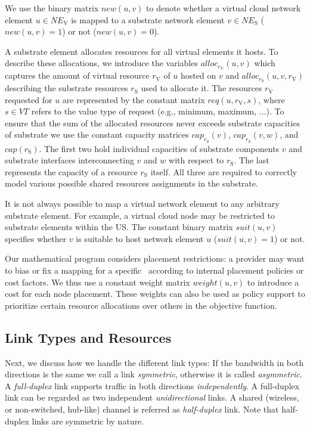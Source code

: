 \documentclass[conference,10pt]{IEEEtran}
\newcommand{\CloudNet}{\text{CloudNet}}
\newcommand{\mrm}{\mathrm}
\begin{document}
We use the binary matrix $new(u,v)$ to denote whether a virtual
cloud network element $u\in NE_\mrm{V}$
is mapped to a substrate network element $v \in
NE_\mrm{S}$ ($new(u,v)=1$) or not ($new(u,v)=0$).

A substrate element allocates resources for all virtual elements it
hosts. To describe these allocations, we introduce the variables
$alloc_{r_\mrm{V}}(u,v)$ which captures the amount of virtual resource $r_\mrm{V}$ of $u$ hosted on $v$ and
$alloc_{r_\mrm{S}}(u,v,r_\mrm{V})$ describing
the substrate resources $r_\mrm{S}$ used to allocate it.
The resources $r_\mrm{V}$ requested for $u$
are represented by the constant matrix $req(u,r_\mrm{V},s)$, where $s\in VT$ refers to the value type of request (e.g., minimum, maximum, ...).
To ensure that
the sum of the allocated resources never exceeds substrate
capacities of substrate we use the constant capacity matrices $cap_{r_\mrm{S}}(v)$, $cap_{r_\mrm{S}}(v,w)$,
and $cap(r_\mrm{S})$. The first two hold individual capacities of substrate components $v$ and substrate interfaces interconnecting $v$ and $w$ with respect to $r_\mrm{S}$. The last represents the capacity of a resource $r_\mrm{S}$ itself.
All three are required to correctly model various possible shared resources assignments in the substrate.

It is not always possible to map a virtual network element to any
arbitrary substrate element. For example, a virtual cloud node may
be restricted to substrate elements within the US. The constant
binary matrix $suit(u,v)$ specifies whether $v$ is suitable to host
network element $u$ ($suit(u,v)=1$) or not.

Our mathematical program considers placement restrictions: a
provider may want to bias or fix a mapping for a specific \CloudNet\
according to internal placement policies or cost factors. We thus use a constant
weight matrix $weight(u,v)$ to introduce a cost for each node
placement. These weights can also be used as policy support to prioritize certain
resource allocations over others in the objective function.

\subsection{Link Types and Resources} \label{ssec:map:approach:links}

Next, we discuss how we handle the different link types: If the
bandwidth in both directions is the same we call a link
\emph{symmetric}, otherwise it is called \emph{asymmetric}.  A
\emph{full-duplex} link supports traffic in both directions
\emph{independently}. A full-duplex link can be regarded as two
independent \emph{unidirectional} links. A shared (wireless, or
non-switched, hub-like) channel is referred as \emph{half-duplex}
link. Note that half-duplex links are symmetric by nature.
\end{document}
